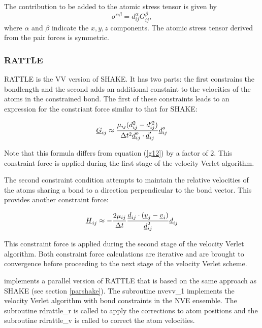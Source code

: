 The contribution to be added to the atomic stress tensor
 is given by
\begin{equation}
\sigma^{\alpha \beta}=d_{ij}^{\alpha}G_{ij}^{\beta},
\end{equation}
where $\alpha$ and $\beta$ indicate the $x,y,z$ components. The atomic
stress tensor derived from the pair forces is symmetric.

\subsubsection{RATTLE}
\label{rattle}

RATTLE \cite{andersen-83a} is the VV version
of SHAKE. It has two parts: the first constrains the bondlength and
the second adds an additional constaint to the velocities of the atoms
in the constrained bond. The first of these constraints leads to an
expression for the constriant force similar to that for SHAKE:

\begin{equation}
\mbox{$\underline{G}$}_{ij}\approx\frac{\mu_{ij}(d_{ij}^{2}-d_{ij}'^{2})}
{\Delta t^{2}\mbox{$\underline{d}$}_{ij}^{o}\cdot\mbox{$\underline{d}$}_{ij}'}\mbox{$\underline{d}$}_{ij}^{o} \label{gg12}
\end{equation}

Note that this formula differs from  equation (\ref{g12}) by a factor
of 2. This constraint force is applied during the first stage of the velocity
Verlet algorithm.

The second constraint condition attempts to maintain the relative
velocities of the atoms sharing a bond to a direction perpendicular to
the bond vector. This provides another constraint force:

\begin{equation}
\mbox{$\underline{H}$}_{ij}\approx-\frac{2\mu_{ij}}{\Delta t}
\frac{\mbox{$\underline{d}$}_{ij}\cdot(\mbox{$\underline{v}$}_{j}-\mbox{$\underline{v}$}_{i})}{\mbox{$\underline{d}$}_{ij}^{2}}
\mbox{$\underline{d}$}_{ij}\label{hh12}
\end{equation}

This constraint force is applied during the second stage of the velocity
Verlet algorithm. Both constraint force calculations are iterative and
are brought to convergence before proceeding to the next stage of the
velocity Verlet scheme.

\D{} implements a parallel version of RATTLE that is based on the same
approach as SHAKE \cite{smith-94b} (see section \ref{parshake}).  The
subroutine {\sc nvevv\_1} implements the velocity Verlet
 algorithm with bond constraints in
the NVE ensemble. The subroutine {\sc rdrattle\_r} is called to apply
the corrections to atom positions and the subroutine {\sc rdrattle\_v}
is called to correct the atom velocities.

